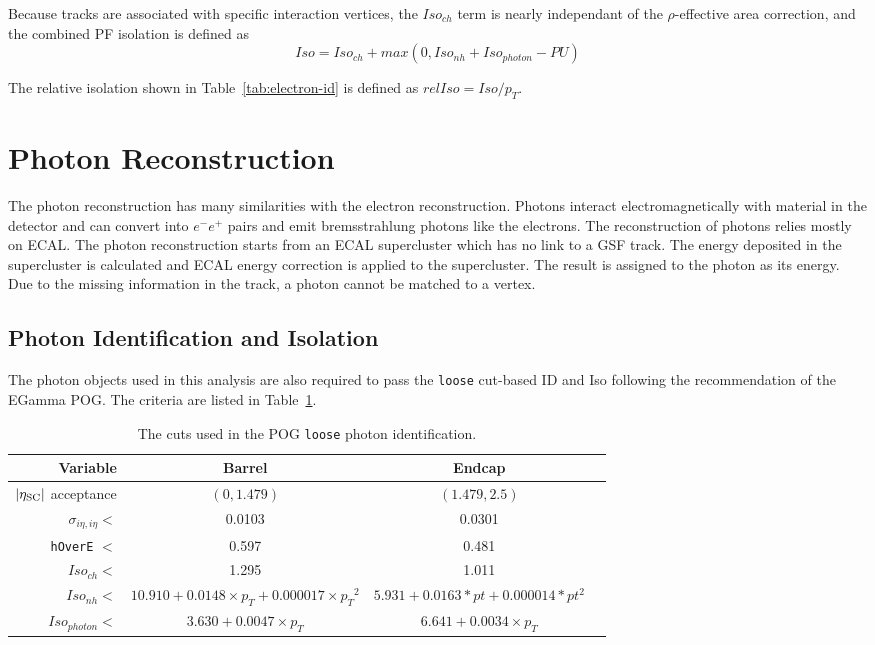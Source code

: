 \vspace{0.3cm}
Because tracks are associated with specific interaction vertices, the $Iso_{ch}$ term is nearly independant of the $\rho$-effective area correction, and the combined PF isolation is defined as
\begin{equation}
Iso=Iso_{ch}+max(0,Iso_{nh}+Iso_{photon}-PU)
\label{eqn:ob_egmiso}
\end{equation}

The relative isolation shown in Table~\ref{tab:electron-id} is defined as $relIso=Iso/p_{T}$.

\section{Photon Reconstruction}
The photon reconstruction has many similarities with the electron reconstruction. Photons interact electromagnetically with material in the detector and can convert into $e^{-}e^{+}$ pairs and emit bremsstrahlung photons like the electrons. The reconstruction of photons relies mostly on ECAL. The photon reconstruction starts from an ECAL supercluster which has no link to a GSF track. The energy deposited in the supercluster is calculated and ECAL energy correction is applied to the supercluster. The result is assigned to the photon as its energy. Due to the missing information in the track, a photon cannot be matched to a vertex.

\subsection{Photon Identification and Isolation}
The photon objects used in this analysis are also required to pass the \texttt{loose} cut-based ID and Iso following the recommendation of the EGamma POG. The criteria are listed in Table~\ref{tab:photon-id}.
\begin{table}[htb!]
\begin{scriptsize}
  \center
  \caption{The cuts used in the POG \texttt{loose} photon identification.}
  \label{tab:photon-id}
  \begin{tabular}{r c c c}
    \hline
    Variable & Barrel & Endcap \\
    \hline
    $|\eta_{\rm SC}|$ acceptance & $(0, 1.479)$ & $(1.479, 2.5)$\\
    $\sigma_{i\eta,i\eta} <$ & 0.0103  & 0.0301 \\
    \texttt{hOverE} $<$ & 0.597  & 0.481 \\
    $Iso_{ch} <$ & 1.295 & 1.011 \\
    $Iso_{nh} <$ & $10.910+0.0148\times p_{T}+0.000017\times {p_{T}}^2$ & $5.931+0.0163*pt+0.000014*pt^2$ \\
    $Iso_{photon} <$ & $3.630+0.0047\times p_{T}$ & $6.641+0.0034\times p_{T}$ \\
    \hline
  \end{tabular}
\end{scriptsize}
\end{table}


